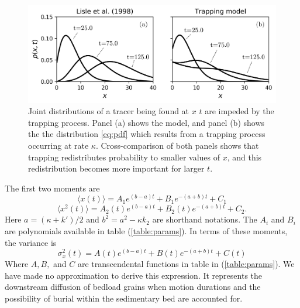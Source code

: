 \documentclass[]{agujournal2018}
\newcommand\be{\begin{equation}}
\newcommand\ee{\end{equation}}
\newcommand\bra{\langle}
\newcommand\ket{\rangle}
\begin{document}
\begin{figure}
	\includegraphics[width=\linewidth,keepaspectratio]{./figures/pdf-plot-edit.png}
	\caption{Joint distributions of a tracer being found at $x$ $t$ are impeded by the trapping process. Panel (a) shows the \citet{Lisle1998} model, and panel (b) shows the the distribution \ref{eq:pdf} which results from a trapping process occurring at rate $\kappa$. Cross-comparison of both panels shows that trapping redistributes probability to smaller values of $x$, and this redistribution becomes more important for larger $t$.}
	\label{fig:pdfs}
\end{figure}
\noindent The first two moments are
\be \bra x(t) \ket = A_1 e^{(b-a)t}+B_1e^{-(a+b)t}+C_1 \label{eq:mean}\ee
\be \bra x^2(t) \ket = A_2(t)e^{(b-a)t}+B_2(t)e^{-(a+b)t}+C_2. \label{eq:second}\ee
Here $a= (\kappa+k')/2$ and $b^2 = a^2 -\kappa k_2$ are shorthand notations.
The $A_i$ and $B_i$ are polynomials available in table (\ref{table:params}).
In terms of these moments, the variance is
\be \sigma_x^2(t) = A(t)e^{(b-a)t} + B(t)e^{-(a+b)t} + C(t) \label{eq:var}\ee
Where $A, B,$ and $C$ are transcendental functions in table in (\ref{table:params}).
We have made no approximation to derive this expression.
It represents the downstream diffusion of bedload grains when motion durations and the possibility of burial within the sedimentary bed are accounted for.
\end{document}
